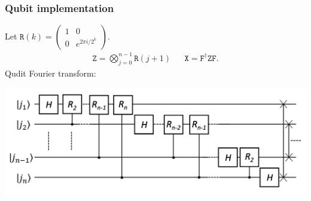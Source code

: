 \documentclass{beamer}
\newcommand{\T}[1]{\texttt{#1}}
\begin{document}
\begin{frame}
\frametitle{Qubit implementation}
	Let $\T{R}(k) = \begin{pmatrix}1 & 0 \\ 0 & e^{2\pi i/2^k} \end{pmatrix}$.
	\begin{align}
\T{Z}= \bigotimes_{j=0}^{n-1} \T{R}(j+1) && \T{X}=\T{F}^\dagger \T{Z}\T{F}.
\end{align}
Qudit Fourier transform:
\begin{center}
\includegraphics[scale=0.45]{img/qft.png}
\end{center}
\end{frame}
\end{document}
